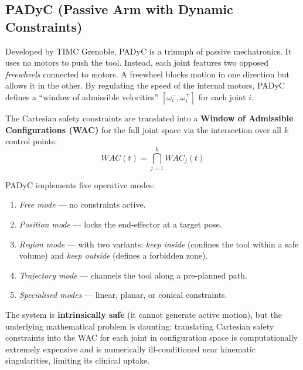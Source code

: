 \documentclass[11pt,a4paper,twoside]{report}
\begin{document}
\subsection{PADyC (Passive Arm with Dynamic Constraints)}
Developed by TIMC Grenoble, PADyC is a triumph of passive mechatronics. It uses no motors to push the tool. Instead, each joint features two opposed \textit{freewheels} connected to motors. A freewheel blocks motion in one direction but allows it in the other. By regulating the speed of the internal motors, PADyC defines a ``window of admissible velocities'' $[\omega_{i}^{-}, \omega_{i}^{+}]$ for each joint $i$.

The Cartesian safety constraints are translated into a \textbf{Window of Admissible Configurations (WAC)} for the full joint space via the intersection over all $k$ control points:
\begin{equation}
    WAC(t) = \bigcap_{j=1}^{k} WAC_j(t)
\end{equation}

PADyC implements five operative modes:
\begin{enumerate}
    \item \textit{Free mode} — no constraints active.
    \item \textit{Position mode} — locks the end-effector at a target pose.
    \item \textit{Region mode} — with two variants: \textit{keep inside} (confines the tool within a safe volume) and \textit{keep outside} (defines a forbidden zone).
    \item \textit{Trajectory mode} — channels the tool along a pre-planned path.
    \item \textit{Specialised modes} — linear, planar, or conical constraints.
\end{enumerate}

The system is \textbf{intrinsically safe} (it cannot generate active motion), but the underlying mathematical problem is daunting: translating Cartesian safety constraints into the WAC for each joint in configuration space is computationally extremely expensive and is numerically ill-conditioned near kinematic singularities, limiting its clinical uptake.
\end{document}
